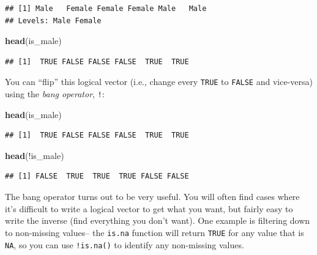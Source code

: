 \documentclass[]{book}
\makeatletter
\newenvironment{Shaded}{\begin{snugshade}}{\end{snugshade}}
\newcommand{\KeywordTok}[1]{\textcolor[rgb]{0.13,0.29,0.53}{\textbf{{#1}}}}
\newcommand{\NormalTok}[1]{{#1}}
\newenvironment{kframe}{%
\medskip{}
\setlength{\fboxsep}{.8em}
 \def\at@end@of@kframe{}%
 \ifinner\ifhmode%
  \def\at@end@of@kframe{\end{minipage}}%
  \begin{minipage}{\columnwidth}%
 \fi\fi%
 \def\FrameCommand##1{\hskip\@totalleftmargin \hskip-\fboxsep
 \colorbox{shadecolor}{##1}\hskip-\fboxsep
     \hskip-\linewidth \hskip-\@totalleftmargin \hskip\columnwidth}%
 \MakeFramed {\advance\hsize-\width
   \@totalleftmargin\z@ \linewidth\hsize
   \@setminipage}}%
 {\par\unskip\endMakeFramed%
 \at@end@of@kframe}
\renewenvironment{Shaded}{\begin{kframe}}{\end{kframe}}
\makeatother
\begin{document}
\begin{Shaded}
\end{Shaded}

\begin{verbatim}
## [1] Male   Female Female Female Male   Male  
## Levels: Male Female
\end{verbatim}

\begin{Shaded}
\begin{Highlighting}[]
\KeywordTok{head}\NormalTok{(is_male)}
\end{Highlighting}
\end{Shaded}

\begin{verbatim}
## [1]  TRUE FALSE FALSE FALSE  TRUE  TRUE
\end{verbatim}

You can ``flip'' this logical vector (i.e., change every \texttt{TRUE}
to \texttt{FALSE} and vice-versa) using the \emph{bang operator},
\texttt{!}:

\begin{Shaded}
\begin{Highlighting}[]
\KeywordTok{head}\NormalTok{(is_male)}
\end{Highlighting}
\end{Shaded}

\begin{verbatim}
## [1]  TRUE FALSE FALSE FALSE  TRUE  TRUE
\end{verbatim}

\begin{Shaded}
\begin{Highlighting}[]
\KeywordTok{head}\NormalTok{(!is_male)}
\end{Highlighting}
\end{Shaded}

\begin{verbatim}
## [1] FALSE  TRUE  TRUE  TRUE FALSE FALSE
\end{verbatim}

The bang operator turns out to be very useful. You will often find cases
where it's difficult to write a logical vector to get what you want, but
fairly easy to write the inverse (find everything you don't want). One
example is filtering down to non-missing values-- the \texttt{is.na}
function will return \texttt{TRUE} for any value that is \texttt{NA}, so
you can use \texttt{!is.na()} to identify any non-missing values.
\end{document}
